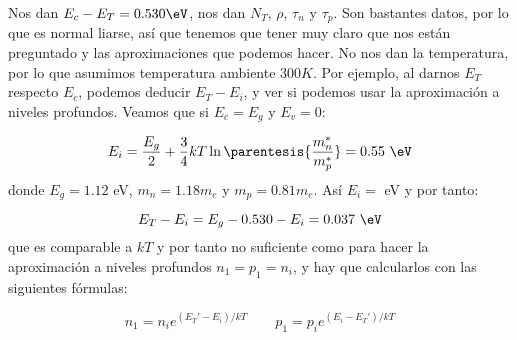
	Nos dan $E_c-E_T=0.530\eV$, nos dan $N_T$, $\rho$, $\tau_n$ y $\tau_p$. Son bastantes datos, por lo que es normal liarse, así que tenemos que tener muy claro que nos están preguntado y las aproximaciones que podemos hacer. No nos dan la temperatura, por lo que asumimos temperatura ambiente $300K$. Por ejemplo, al darnos $E_T$ respecto $E_c$, podemos deducir $E_T-E_i$, y ver si podemos usar la aproximación a niveles profundos. Veamos que si $E_c=E_g$ y $E_v=0$:
	
	\begin{equation}
		E_i = \frac{E_g}{2} + \frac{3}{4} kT \ln \parentesis{\frac{m_n^*}{m_p^*}} = 0.55 \ \eV
	\end{equation}
	donde $E_g=1.12$ eV, $m_n=1.18m_e$ y $m_p=0.81m_e$. Así $E_i=$ eV y por tanto:

	\begin{equation}
		E_T - E_i = E_g - 0.530 - E_i =0.037 \ \eV		
	\end{equation}
	que es comparable a $kT$ y por tanto no suficiente como para hacer la aproximación a niveles profundos $n_1=p_1=n_i$, y hay que calcularlos con las siguientes fórmulas:

	\begin{equation}
		n_1 = n_i e^{(E_T'-E_i)/kT} 	\qquad
		p_1 = p_i e^{(E_i-E_T')/kT}
	\end{equation}

